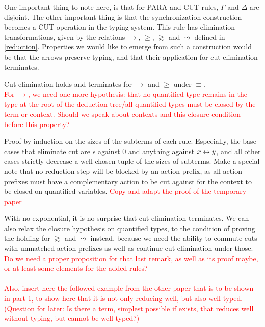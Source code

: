 \begin{definition}
{}
\end{definition}

One important thing to note here, is that for PARA and CUT rules, $\Gamma$ and $\Delta$ are disjoint. The other important thing is that the synchronization construction becomes a CUT operation in the typing system. This rule has elimination transformations, given by the relations $\to$, $\geq$, $\gtrsim$ and $\leadsto$ defined in \ref{reduction}. Properties we would like to emerge from such a construction would be that the arrows preserve typing, and that their application for cut elimination terminates.

\begin{proposition}
Cut elimination holds and terminates for $\to$ and $\geq$ under $\equiv$.\\
\textcolor{red}{For $\to$, we need one more hypothesis: that no quantified type remains in the type at the root of the deduction tree/all quantified types must be closed by the term or context. Should we speak about contexts and this closure condition before this property?} %
\end{proposition}

\begin{myproof}
Proof by induction on the sizes of the subterms of each rule. Especially, the base cases that eliminate cut are $\epsilon$ against 0 and anything against $x \leftrightarrow y$, and all other cases strictly decrease a well chosen tuple of the sizes of subterms. Make a special note that no reduction step will be blocked by an action prefix, as all action prefixes must have a complementary action to be cut against for the context to be closed on quantified variables. \textcolor{red}{Copy and adapt the proof of the temporary paper} %
\end{myproof}

\remark With no exponential, it is no surprise that cut elimination terminates. We can also relax the closure hypothesis on quantified types, to the condition of proving the holding for $\gtrsim$ and $\leadsto$ instead, because we need the ability to commute cuts with unmatched action prefixes as well as continue cut elimination under those.\\

\textcolor{red}{Do we need a proper proposition for that last remark, as well as its proof maybe, or at least some elements for the added rules?\\~\\
Also, insert here the followed example from the other paper that is to be shown in part 1, to show here that it is not only reducing well, but also well-typed. (Question for later: Is there a term, simplest possible if exists, that reduces well without typing, but cannot be well-typed?)} %
